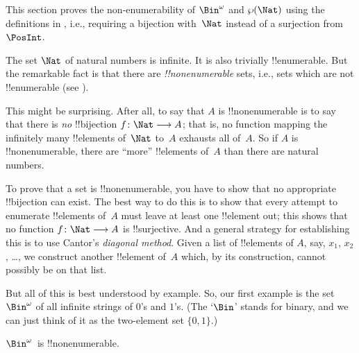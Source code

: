 \documentclass[../../../include/open-logic-section]{subfiles}
\begin{document}


\begin{editorial}
  This section proves the non-enumerability of $\Bin^\omega$ and
  $\Pow{\Nat}$ using the definitions in , i.e.,
  requiring a bijection with~$\Nat$ instead of a surjection from
  $\PosInt$.
\end{editorial}

\begin{explain}
The set $\Nat$ of natural numbers is infinite. It is also trivially
!!{enumerable}. But the remarkable fact is that there are
\emph{!!{nonenumerable}} sets, i.e., sets which are not !!{enumerable}
(see ).

This might be surprising. After all, to say that $A$ is
!!{nonenumerable} is to say that there is \emph{no} !!{bijection} $f
\colon \Nat \to A$; that is, no function mapping the infinitely many
!!{element}s of~$\Nat$ to~$A$ exhausts all of~$A$.  So if $A$ is
!!{nonenumerable}, there are ``more'' !!{element}s of~$A$ than there
are natural numbers.

To prove that a set is !!{nonenumerable}, you have to show that no
appropriate !!{bijection} can exist. The best way to do this is to
show that every attempt to enumerate !!{element}s of~$A$ must leave at
least one !!{element} out; this shows that no function $f\colon \Nat
\to A$ is !!{surjective}. And a general strategy for establishing this
is to use Cantor's \emph{diagonal method}. Given a list of
!!{element}s of $A$, say, $x_1$, $x_2$, \dots, we construct another
!!{element} of~$A$ which, by its construction, cannot possibly be on
that list.

But all of this is best understood by example. So, our first example
is the set~$\Bin^\omega$ of all infinite strings of $0$'s and $1$'s.
(The `$\Bin$' stands for binary, and we can just think of it as the
two-element set
$\{0,1\}$.)
\end{explain}

\begin{thm}
$\Bin^\omega$~is !!{nonenumerable}.
\end{thm}
\end{document}

